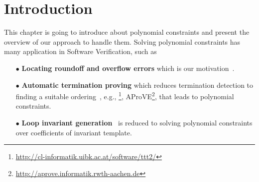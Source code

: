 \chapter{Introduction}
This chapter is going to introduce about polynomial constraints and present the overview of our approach to handle them. Solving polynomial constraints has many application in Software Verification, such as 
\begin{itemize}
\item[$\bullet$] {\bf Locating roundoff and overflow errors}
which is our motivation~\cite{Ngoc:2009:ORE:1685167.1685421,Ngoc:2010:CRE:1858996.1859056}.

\item[$\bullet$] {\bf Automatic termination proving} 
which reduces termination detection to finding a suitable ordering~\cite{Lucas:2008:CCS:1361735.1361760}, 
e.g., \TTTT\footnote{\url{http://cl-informatik.uibk.ac.at/software/ttt2/}}, 
AProVE\footnote{\url{http://aprove.informatik.rwth-aachen.de}}, that leads to polynomial constraints. 

\item[$\bullet$] {\bf Loop invariant generation}~\cite{Colon,Sankaranarayanan:2004:NLI:982962.964028} is reduced to solving polynomial constraints over coefficients of invariant template. 


\begin{comment}
\item {\bf Hybrid system}. Solving polynomial constraints over real numbers is often used as backend engines~\cite{Sankaranarayanan04constructinginvariants}. 

\item {\bf Mechanical contrnol design}. 
PID control is simple but widely used, and designing parameters is 
reduced to polynomial constraints~\cite{control}. 
\end{comment}
\end{itemize}
